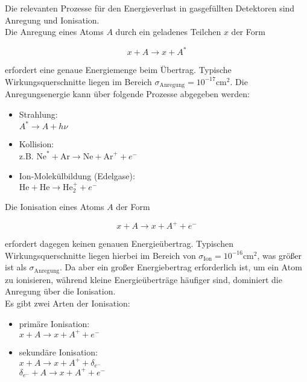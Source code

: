 Die relevanten Prozesse für den Energieverlust in gasgefüllten Detektoren sind Anregung und
Ionisation.
\\
Die Anregung eines Atoms $A$ durch ein geladenes Teilchen $x$ der Form

\[x+A \longrightarrow x+ A^*\]

erfordert eine genaue Energiemenge beim Übertrag. Typische Wirkungsquerschnitte liegen
im Bereich $\sigma_{\text{Anregung}}=10^{-17}\text{cm}^2$. Die Anregungsenergie kann über folgende Prozesse
abgegeben werden:

\begin{itemize}
  \item Strahlung:\\ $A^*\longrightarrow A+h\nu$
  \item Kollision:\\ z.B. $\text{Ne}^*+\text{Ar}\longrightarrow \text{Ne}+\text{Ar}^++e^-$
  \item Ion-Molekülbildung (Edelgase):\\ $\text{He}+\text{He} \longrightarrow\text{He}^+_2+e^-$
\end{itemize}

Die Ionisation eines Atoms $A$ der Form

\[x+A \longrightarrow x+ A^+ +e^- \]

erfordert dagegen keinen genauen Energieübertrag. Typischen Wirkungsquerschnitte liegen hierbei im
Bereich von $\sigma_{\text{Ion}}=10^{-16}\text{cm}^2$, was größer ist als
$\sigma_{\text{Anregung}}$. Da aber ein großer Energiebertrag erforderlich ist, um ein Atom zu
ionisieren, während kleine Energieüberträge häufiger sind, dominiert die Anregung über die Ionisation.
\\
Es gibt zwei Arten der Ionisation:

\begin{itemize}
  \item primäre Ionisation:\\ $x+A \longrightarrow x+A^++e^-$
  \item sekundäre Ionisation:\\ $x+A \longrightarrow x+A^++\delta_{e^-}$ \\ $\delta_{e^-}+A \longrightarrow
  x+A^++e^-$
\end{itemize}
